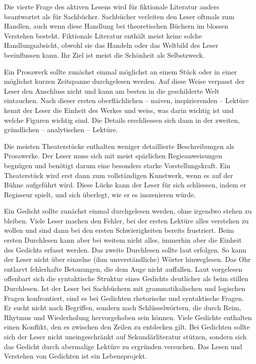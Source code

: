 \documentclass[a4paper,11pt]{scrartcl}
\begin{document}
Die vierte Frage des aktiven Lesens wird für fiktionale Literatur anders beantwortet als für Sachbücher. Sachbücher verleiten den Leser oftmals zum Handlen, auch wenn diese Handlung bei theoretischen Büchern im blossen Verstehen besteht. Fiktionale Literatur enthält meist keine solche Handlungsabsicht, obwohl sie das Handeln oder das Weltbild des Leser beeinflussen kann. Ihr Ziel ist meist die Schönheit als Selbstzweck.

Ein Prosawerk sollte zunächst einmal möglichst an einem Stück oder in einer möglichst kurzen Zeitspanne durchgelesen werden. Auf diese Weise verpasst der Leser den Anschluss nicht und kann am besten in die geschilderte Welt eintauchen. Nach dieser ersten oberflächlichen – naiven, inspizierenden – Lektüre kennt der Leser die Einheit des Werkes und weiss, was darin wichtig ist und welche Figuren wichtig sind. Die Details erschliessen sich dann in der zweiten, gründlichen – analytischen – Lektüre.

Die meisten Theaterstücke enthalten weniger detaillierte Beschreibungen als Prosawerke. Der Leser muss sich mit meist spärlichen Regieanweisungen begnügen und benötigt darum eine besonders starke Vorstellungskraft. Ein Theaterstück wird erst dann zum vollständigen Kunstwerk, wenn es auf der Bühne aufgeführt wird. Diese Lücke kann der Leser für sich schliessen, indem er Regisseur spielt, und sich überlegt, wie er es inszenieren würde.

Ein Gedicht sollte zunächst einmal durchgelesen werden, ohne irgendwo stehen zu bleiben. Viele Leser machen den Fehler, bei der ersten Lektüre alles verstehen zu wollen und sind dann bei den ersten Schwierigkeiten bereits frustriert. Beim ersten Durchlesen kann aber bei weitem nicht alles, immerhin aber die Einheit des Gedichts erfasst werden. Das zweite Durchlesen sollte laut erfolgen. So kann der Leser nicht über einzelne (ihm unverständliche) Wörter hinweglesen. Das Ohr entlarvt fehlerhafte Betonungen, die dem Auge nicht auffallen. Laut vorgelesen offenbart sich die syntaktische Struktur eines Gedichts deutlicher als beim stillen Durchlesen. Ist der Leser bei Sachbüchern mit grammatikalischen und logischen Fragen konfrontiert, sind es bei Gedichten rhetorische und syntaktische Fragen. Er sucht nicht nach Begriffen, sondern nach Schlüsselwörtern, die durch Reim, Rhytmus und Wiederholung hervorgehoben sein können. Viele Gedichte enthalten einen Konflikt, den es zwischen den Zeilen zu entdecken gilt. Bei Gedichten sollte sich der Leser nicht uneingeschränkt auf Sekundärliteratur stützen, sondern sich das Gedicht durch abermalige Lektüre zu ergründen versuchen. Das Lesen und Verstehen von Gedichten ist ein Lebensprojekt.
\end{document}
